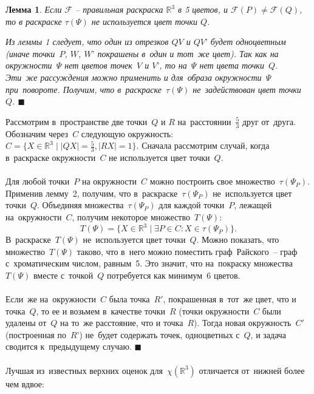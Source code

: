 \documentclass{report}%
\newtheorem{lemma}{Лемма}
\newenvironment{proof}{\par\noindent{\bf Доказательство.}}{\hfill$\scriptstyle\blacksquare$}
\begin{document}
\begin{lemma}
		Если $\mathcal{F}$ – правильная раскраска $\mathbb{R}^3$ в 5 цветов, и $\mathcal{F}(P) \ne \mathcal{F}(Q)$,
		то в раскраске $\tau(\Psi)$ не используется цвет точки $Q$. \\
		\begin{proof}
				Из леммы 1 следует, что один из отрезков $QV$ и $QV’$ будет одноцветным
				(иначе точки~$P$, $W$, $W’$ покрашены в~один и тот~же цвет).
				Так как на окружности~$\Psi$ нет цветов точек~$V$ и $V’$, то на~$\Psi$ нет цвета точки~$Q$.
				Эти~же рассуждения можно применить и для~образа окружности~$\Psi$ при~повороте.
				Получим, что в~раскраске~$\tau(\Psi)$ не~задействован цвет точки~$Q$.
		\end{proof}
\end{lemma}

\begin{proof}
		Рассмотрим в~пространстве две точки~$Q$ и $R$ на~расстоянии~$\frac{5}{3}$ друг от~друга.
		Обозначим через~$C$ следующую окружность: \\$C = \{X \in  \mathbb{R}^3 \mid |QX|= \frac{5}{3},|RX| = 1 \}$.
		Сначала рассмотрим случай, когда в~раскраске окружности~$C$ не используется цвет точки~$Q$. \\\\
		Для любой точки~$P$ на окружности~$C$ можно построить свое множество~$\tau(\Psi_P)$.
		Применив лемму~2, получим, что в~раскраске~$\tau(\Psi_P)$ не~используется цвет точки~$Q$.
		Объединяя множества~$\tau(\Psi_P)$ для каждой точки~$P$, лежащей на~окружности~$C$, получим некоторое множество~$T(\Psi)$: 
		\begin{equation}
				T(\Psi) = \{X \in \mathbb{R}^3 \mid \exists P \in C \colon X \in \tau(\Psi_P) \}.
		\end{equation}
		В~раскраске~$T(\Psi)$ не~используется цвет точки~$Q$. Можно показать, что множество~$T(\Psi)$ таково,
		что в~него можно поместить граф~Райского~– граф с~хроматическим числом, равным~5.
		Это значит, что на~покраску множества~$T(\Psi)$ вместе с~точкой~$Q$ потребуется как минимум~6 цветов.\\\\
		Если~же на~окружности~$C$ была точка~$R'$, покрашенная в~тот~же цвет, что и точка~$Q$,
		то ее и возьмем в~качестве точки~$R$ (точки окружности~$C$ были удалены от~$Q$ на то~же расстояние, что и точка~$R$).
		Тогда новая окружность~$C'$ (построенная по~$R’$) не~будет содержать точек, одноцветных с~$Q$, и задача
		сводится к~предыдущему случаю.
\end{proof}\\\\
\noindent Лучшая из~известных верхних оценок для~$\chi(\mathbb{R}^3)$ отличается от~нижней более чем вдвое:
\end{document}
